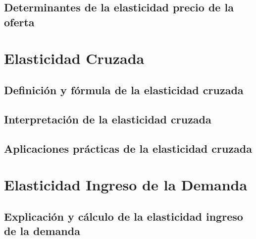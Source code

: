 \documentclass[
  a4paper,
]{article}
\begin{document}
\hypertarget{determinantes-de-la-elasticidad-precio-de-la-oferta}{%
\subsection{Determinantes de la elasticidad precio de la
oferta}\label{determinantes-de-la-elasticidad-precio-de-la-oferta}}

\hypertarget{elasticidad-cruzada}{%
\section{Elasticidad Cruzada}\label{elasticidad-cruzada}}

\hypertarget{definiciuxf3n-y-fuxf3rmula-de-la-elasticidad-cruzada}{%
\subsection{Definición y fórmula de la elasticidad
cruzada}\label{definiciuxf3n-y-fuxf3rmula-de-la-elasticidad-cruzada}}

\hypertarget{interpretaciuxf3n-de-la-elasticidad-cruzada}{%
\subsection{Interpretación de la elasticidad
cruzada}\label{interpretaciuxf3n-de-la-elasticidad-cruzada}}

\hypertarget{aplicaciones-pruxe1cticas-de-la-elasticidad-cruzada}{%
\subsection{Aplicaciones prácticas de la elasticidad
cruzada}\label{aplicaciones-pruxe1cticas-de-la-elasticidad-cruzada}}

\hypertarget{elasticidad-ingreso-de-la-demanda}{%
\section{Elasticidad Ingreso de la
Demanda}\label{elasticidad-ingreso-de-la-demanda}}

\hypertarget{explicaciuxf3n-y-cuxe1lculo-de-la-elasticidad-ingreso-de-la-demanda}{%
\subsection{Explicación y cálculo de la elasticidad ingreso de la
demanda}\label{explicaciuxf3n-y-cuxe1lculo-de-la-elasticidad-ingreso-de-la-demanda}}
\end{document}
